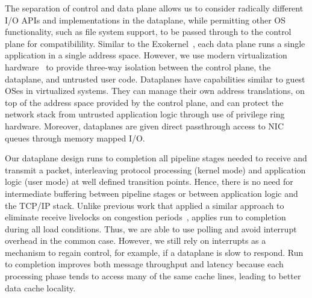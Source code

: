 The separation of control and data plane allows us to consider
radically different I/O APIs and implementations in the dataplane,
while permitting other OS functionality, such as file system support,
to be passed through to the control plane for compatibilility.
Similar to the Exokernel~\cite{DBLP:conf/sosp/EnglerKO95}, each data
plane runs a single application in a single address space. However, we
use modern virtualization hardware~\cite{dune} to provide three-way
isolation between the control plane, the dataplane, and untrusted user
code. Dataplanes have capabilities similar to guest OSes in
virtualized systems.  They can manage their own address translations,
on top of the address space provided by the control plane, and can
protect the network stack from untrusted application logic through use
of privilege ring hardware. Moreover, dataplanes are given direct
passthrough access to NIC queues through memory mapped I/O.



 Our dataplane
design runs to completion all pipeline stages needed to receive and
transmit a packet, interleaving protocol processing (kernel mode) and
application logic (user mode) at well defined transition
points. Hence, there is no need for intermediate buffering between
pipeline stages or between application logic and the TCP/IP stack.
Unlike previous work that applied a similar approach to eliminate
receive livelocks on congestion periods~\cite{receive-livelock}, \ix
applies run to completion during all load conditions. Thus, we are
able to use polling and avoid interrupt overhead in the common
case. However, we still rely on interrupts as a mechanism to regain
control, for example, if a dataplane is slow to respond.  Run to
completion improves both message throughput and latency because each
processing phase tends to access many of the same cache lines, leading
to better data cache locality.

